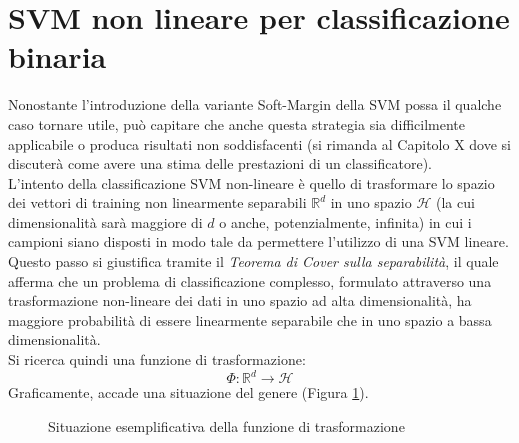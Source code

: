 \section{SVM non lineare per classificazione binaria}
Nonostante l'introduzione della variante Soft-Margin della SVM possa il qualche caso tornare utile, può capitare che anche questa strategia sia difficilmente applicabile o produca risultati non soddisfacenti (si rimanda al Capitolo X dove si discuterà come avere una stima delle prestazioni di un classificatore).
\\

L'intento della classificazione SVM non-lineare è quello di trasformare lo spazio dei vettori di training non linearmente separabili $\mathbb{R}^d$ in uno spazio $\mathcal{H}$ (la cui dimensionalità sarà maggiore di $d$ o anche, potenzialmente, infinita) in cui i campioni siano disposti in modo tale da permettere l'utilizzo di una SVM lineare. Questo passo si giustifica tramite il \emph{Teorema di Cover sulla separabilità}, il quale afferma che un problema di classificazione complesso, formulato attraverso una trasformazione non-lineare dei dati in uno spazio ad alta dimensionalità, ha maggiore probabilità di essere linearmente separabile che in uno spazio a bassa dimensionalità.
\\
Si ricerca quindi una funzione di trasformazione:
\begin{equation}
\label{eq:funzione_di_trasformazione}
\Phi:\mathbb{R}^d\rightarrow\mathcal{H}
\end{equation}
Graficamente, accade una situazione del genere (Figura \ref{fig:funzione_di_trasformazione}).
 \begin{figure}[!ht]
    \caption{Situazione esemplificativa della funzione di trasformazione}
    \label{fig:funzione_di_trasformazione}
  \end{figure}
